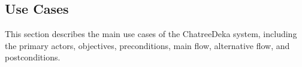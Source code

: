 \subsection{Use Cases}

This section describes the main use cases of the ChatreeDeka system, including the primary actors, objectives, preconditions, main flow, alternative flow, and postconditions.


